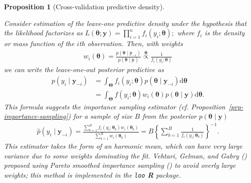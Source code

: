\documentclass[
  11pt,
  letterpaper,
]{scrbook}
\theoremstyle{definition}
\theoremstyle{plain}
\theoremstyle{plain}
\theoremstyle{plain}
\newtheorem{proposition}{Proposition}[chapter]
\theoremstyle{definition}
\theoremstyle{definition}
\theoremstyle{remark}
\begin{document}
\begin{proposition}[Cross-validation predictive
density]\protect\hypertarget{prp-cv-predictive-dens}{}\label{prp-cv-predictive-dens}

Consider estimation of the leave-one predictive density under the
hypothesis that the likelihood factorizes as
\(L(\boldsymbol{\theta}; \boldsymbol{y}) = \prod_{i=1}^n f_i(y_i; \boldsymbol{\theta});\)
where \(f_i\) is the density or mass function of the \(i\)th
observation. Then, with weights \begin{align*}
w_i(\boldsymbol{\theta}) = \frac{p(\boldsymbol{\theta} \mid \boldsymbol{y}_{-i})}{p(\boldsymbol{\theta} \mid \boldsymbol{y})} \stackrel{\boldsymbol{\theta}}{\propto} \frac{1}{f_i(y_i; \boldsymbol{\theta})}
\end{align*} we can write the leave-one-out posterior predictive as
\begin{align*}
p(y_i \mid \boldsymbol{y}_{-i}) &= \int_{\boldsymbol{\Theta}} f_i(y_i; \boldsymbol{\theta}) p(\boldsymbol{\theta} \mid \boldsymbol{y}_{-i}) \mathrm{d} \boldsymbol{\theta}
\\& = \int_{\boldsymbol{\Theta}} f(y_i; \boldsymbol{\theta}) w_i(\boldsymbol{\theta}) p(\boldsymbol{\theta} \mid \boldsymbol{y}) \mathrm{d} \boldsymbol{\theta}.
\end{align*} This formula suggests the importance sampling estimator
(cf. Proposition~\ref{prp-importance-sampling}) for a sample of size
\(B\) from the posterior \(p(\boldsymbol{\theta} \mid \boldsymbol{y})\)
\begin{align*}
\widehat{p}(y_i \mid \boldsymbol{y}_{-i}) = \frac{\sum_{b=1}^B f_i(y_i; \boldsymbol{\theta}_b) w_i(\boldsymbol{\theta}_b)}{\sum_{b=1}^Bw_i(\boldsymbol{\theta}_b)}  = B \left\{\sum_{b=1}^B \frac{1}{f_i (y_i; \boldsymbol{\theta}_b)}\right\}^{-1}.
\end{align*} This estimator takes the form of an harmonic mean, which
can have very large variance due to some weights dominating the fit.
Vehtari, Gelman, and Gabry
() proposed using Pareto
smoothed importance sampling
() to avoid overly large weights; this method is implemented in the
\texttt{loo} \textbf{R} package.


\end{proposition}
\end{document}

